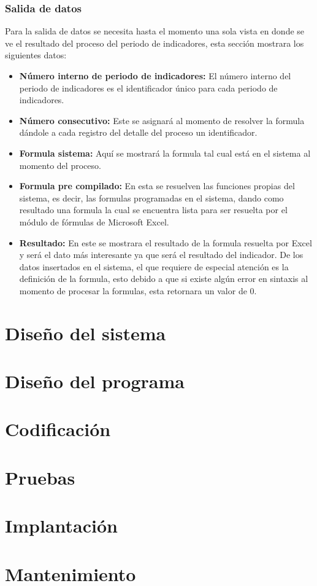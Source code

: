 		\subsubsection{Salida de datos}

			Para la salida de datos se necesita hasta el momento una sola vista en donde se ve el resultado del proceso del periodo de indicadores, esta secci\'on mostrara los siguientes datos:
			\begin{itemize}
				\item \textbf{N\'umero interno de periodo de indicadores:} El n\'umero interno del periodo de indicadores es el identificador \'unico para cada periodo de indicadores.
				\item \textbf{N\'umero consecutivo:} Este se asignar\'a al momento de resolver la formula d\'andole a cada registro del detalle del proceso un identificador.
				\item \textbf{Formula sistema:} Aqu\'i se mostrar\'a la formula tal cual est\'a en el sistema al momento del proceso.
				\item \textbf{Formula pre compilado:} En esta se resuelven las funciones propias del sistema, es decir, las formulas programadas en el sistema, dando como resultado una formula la cual se encuentra lista para ser resuelta por el m\'odulo de f\'ormulas de Microsoft Excel.
				\item \textbf{Resultado:} En este se mostrara el resultado de la formula resuelta por Excel y ser\'a el dato m\'as interesante ya que ser\'a el resultado del indicador.
				De los datos insertados en el sistema, el que requiere de especial atenci\'on es la definici\'on de la formula, esto debido a que si existe alg\'un error en sintaxis al momento de procesar la formulas, esta retornara un valor de 0.
			\end{itemize}



	\section{Dise\~no del sistema}
	\section{Dise\~no del programa}
	\section{Codificaci\'on}
	\section{Pruebas}
	\section{Implantaci\'on}
	\section{Mantenimiento}